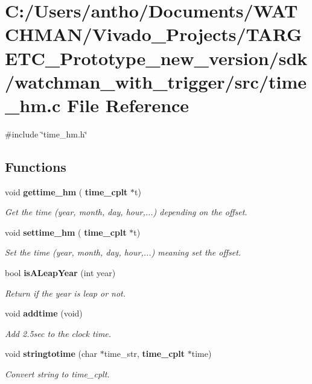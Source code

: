 \section{C\+:/\+Users/antho/\+Documents/\+W\+A\+T\+C\+H\+M\+A\+N/\+Vivado\+\_\+\+Projects/\+T\+A\+R\+G\+E\+T\+C\+\_\+\+Prototype\+\_\+new\+\_\+version/sdk/watchman\+\_\+with\+\_\+trigger/src/time\+\_\+hm.c File Reference}
\label{time__hm_8c}
{\ttfamily \#include \char`\"{}time\+\_\+hm.\+h\char`\"{}}\newline
\subsection*{Functions}
\begin{DoxyCompactItemize}
\item 
void \textbf{ gettime\+\_\+hm} (\textbf{ time\+\_\+cplt} $\ast$t)
\begin{DoxyCompactList}\small\item\em Get the time (year, month, day, hour,...) depending on the offset. \end{DoxyCompactList}\item 
void \textbf{ settime\+\_\+hm} (\textbf{ time\+\_\+cplt} $\ast$t)
\begin{DoxyCompactList}\small\item\em Set the time (year, month, day, hour,...) meaning set the offset. \end{DoxyCompactList}\item 
bool \textbf{ is\+A\+Leap\+Year} (int year)
\begin{DoxyCompactList}\small\item\em Return if the year is leap or not. \end{DoxyCompactList}\item 
void \textbf{ addtime} (void)
\begin{DoxyCompactList}\small\item\em Add 2.\+5sec to the clock time. \end{DoxyCompactList}\item 
void \textbf{ stringtotime} (char $\ast$time\+\_\+str, \textbf{ time\+\_\+cplt} $\ast$time)
\begin{DoxyCompactList}\small\item\em Convert string to time\+\_\+cplt. \end{DoxyCompactList}\end{DoxyCompactItemize}
